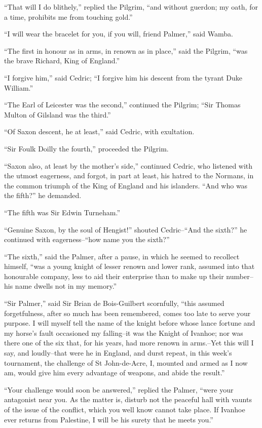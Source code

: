 ``That will I do blithely,'' replied the Pilgrim, ``and without guerdon;
my oath, for a time, prohibits me from touching gold.''

``I will wear the bracelet for you, if you will, friend Palmer,'' said
Wamba.

``The first in honour as in arms, in renown as in place,'' said the
Pilgrim, ``was the brave Richard, King of England.''

``I forgive him,'' said Cedric; ``I forgive him his descent from the
tyrant Duke William.''

``The Earl of Leicester was the second,'' continued the Pilgrim; ``Sir
Thomas Multon of Gilsland was the third.''

``Of Saxon descent, he at least,'' said Cedric, with exultation.

``Sir Foulk Doilly the fourth,'' proceeded the Pilgrim.

``Saxon also, at least by the mother's side,'' continued Cedric, who
listened with the utmost eagerness, and forgot, in part at least, his
hatred to the Normans, in the common triumph of the King of England and
his islanders. ``And who was the fifth?'' he demanded.

``The fifth was Sir Edwin Turneham.''

``Genuine Saxon, by the soul of Hengist!'' shouted Cedric--``And the
sixth?'' he continued with eagerness--``how name you the sixth?''

``The sixth,'' said the Palmer, after a pause, in which he seemed to
recollect himself, ``was a young knight of lesser renown and lower rank,
assumed into that honourable company, less to aid their enterprise than
to make up their number--his name dwells not in my memory.''

``Sir Palmer,'' said Sir Brian de Bois-Guilbert scornfully, ``this
assumed forgetfulness, after so much has been remembered, comes too late
to serve your purpose. I will myself tell the name of the knight before
whose lance fortune and my horse's fault occasioned my falling--it was
the Knight of Ivanhoe; nor was there one of the six that, for his years,
had more renown in arms.--Yet this will I say, and loudly--that were he
in England, and durst repeat, in this week's tournament, the challenge
of St John-de-Acre, I, mounted and armed as I now am, would give him
every advantage of weapons, and abide the result.''

``Your challenge would soon be answered,'' replied the Palmer, ``were
your antagonist near you. As the matter is, disturb not the peaceful
hall with vaunts of the issue of the conflict, which you well know
cannot take place. If Ivanhoe ever returns from Palestine, I will be his
surety that he meets you.''

